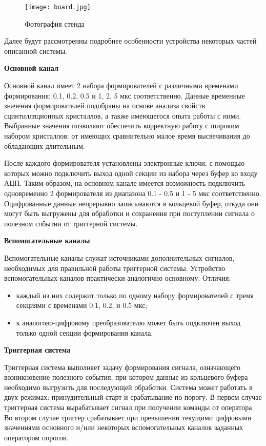 \begin{figure}[ht]
    \centering
    \texttt{[image: board.jpg]}
    \caption{Фотография стенда}
    \label{fig:board}
\end{figure}
Далее будут рассмотренны подробнее особенности устройства некоторых частей описанной системы.\par
\textbf{Основной канал}\par
Основной канал имеет 2 набора формирователей с различными временами формирования: 0.1, 0.2, 0.5 и 1, 2, 5 мкс соответственно. Данные временные значения формирователей подобраны на основе анализа свойств сцинтилляционных кристаллов, а также имеющегося опыта работы с ними. Выбранные значения позволяют обеспечить корректную работу с широким набором кристаллов: от имеющих сравнительно малое время высвечивания до обладающих длительным.\par
После каждого формирователя установлены электронные ключи, с помощью которых можно подключить выход одной секции из набора через буфер ко входу АЦП. Таким образом, на основном канале имеется возможность подключить одновременно 2 формирователя из диапазона 0.1 - 0.5 и 1 - 5 мкс соответственно. Оцифрованные данные непрерывно записываются в кольцевой буфер, откуда они могут быть выгружены для обработки и сохранения при поступлении сигнала о полезном событии от триггерной системы.\par
\textbf{Вспомогательные каналы}\par
Вспомогательные каналы служат источниками дополнительных сигналов, необходимых для правильной работы триггерной системы. Устройство вспомогательных каналов практически аналогично основному. Отличия:\par
\begin{itemize}
    \item каждый из них содержит только по одному набору формирователей с тремя секциями с временами 0.1, 0.2, и 0.5 мкс;
    \item к аналогово-цифровому преобразователю может быть подключен выход только одной секции формирования канала.
\end{itemize}\par
\textbf{Триггерная система}\par
Триггерная система выполняет задачу формирования сигнала, означающего возникновение полезного события, при котором данные из кольцевого буфера необходимо выгрузить для последующей обработки. Система может работать в двух режимах: принудительный старт и срабатывание по порогу. В первом случае триггерная система вырабатывает сигнал при получении команды от оператора. Во втором случае триггер срабатывает при превышении текущими цифровыми значениями основного и/или некоторых вспомогательных каналов заданных оператором порогов.
